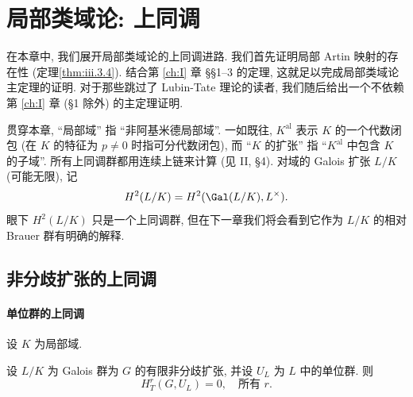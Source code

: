 
\chapter{局部类域论: 上同调}\label{ch:III}

在本章中, 我们展开局部类域论的上同调进路. 我们首先证明局部 Artin 映射的存在性 (定理\ref{thm:iii.3.4}). 结合第 \ref{ch:I} 章 \S\S 1--3 的定理, 这就足以完成局部类域论主定理的证明. 对于那些跳过了 Lubin-Tate 理论的读者, 我们随后给出一个不依赖第 \ref{ch:I} 章 (\S 1 除外) 的主定理证明.

贯穿本章, ``局部域'' 指 ``非阿基米德局部域''. 一如既往, $K^{\mathrm{al}}$ 表示 $K$ 的一个代数闭包 (在 $K$ 的特征为 $p\neq 0$ 时指可分代数闭包), 而 ``$K$ 的扩张'' 指 ``$K^{\mathrm{al}}$ 中包含 $K$ 的子域''. 所有上同调群都用连续上链来计算 (见 II, \S 4). 对域的 Galois 扩张 $L/K$ (可能无限), 记
\[
 H^2(L/K)=H^2(\Gal(L/K),L^\times).
\]
眼下 $H^2(L/K)$ 只是一个上同调群, 但在下一章我们将会看到它作为 $L/K$ 的相对 Brauer 群有明确的解释.

\section{非分歧扩张的上同调}\label{sec:III.1}

\subsubsection*{单位群的上同调}

设 $K$ 为局部域.

\begin{proposition}\label{prop:iii.1.1}
设 $L/K$ 为 Galois 群为 $G$ 的有限非分歧扩张, 并设 $U_L$ 为 $L$ 中的单位群. 则
\[
 H_T^r(G,U_L)=0,\quad\text{所有 }r.
\]
\end{proposition}

